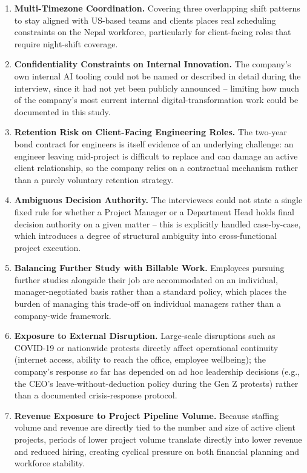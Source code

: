 \documentclass[12pt,a4paper]{report}
\begin{document}
\begin{enumerate}[leftmargin=1.5cm]
  \item \textbf{Multi-Timezone Coordination.} Covering three overlapping shift patterns to stay aligned with US-based teams and clients places real scheduling constraints on the Nepal workforce, particularly for client-facing roles that require night-shift coverage.
  \item \textbf{Confidentiality Constraints on Internal Innovation.} The company's own internal AI tooling could not be named or described in detail during the interview, since it had not yet been publicly announced -- limiting how much of the company's most current internal digital-transformation work could be documented in this study.
  \item \textbf{Retention Risk on Client-Facing Engineering Roles.} The two-year bond contract for engineers is itself evidence of an underlying challenge: an engineer leaving mid-project is difficult to replace and can damage an active client relationship, so the company relies on a contractual mechanism rather than a purely voluntary retention strategy.
  \item \textbf{Ambiguous Decision Authority.} The interviewees could not state a single fixed rule for whether a Project Manager or a Department Head holds final decision authority on a given matter -- this is explicitly handled case-by-case, which introduces a degree of structural ambiguity into cross-functional project execution.
  \item \textbf{Balancing Further Study with Billable Work.} Employees pursuing further studies alongside their job are accommodated on an individual, manager-negotiated basis rather than a standard policy, which places the burden of managing this trade-off on individual managers rather than a company-wide framework.
  \item \textbf{Exposure to External Disruption.} Large-scale disruptions such as COVID-19 or nationwide protests directly affect operational continuity (internet access, ability to reach the office, employee wellbeing); the company's response so far has depended on ad hoc leadership decisions (e.g., the CEO's leave-without-deduction policy during the Gen Z protests) rather than a documented crisis-response protocol.
  \item \textbf{Revenue Exposure to Project Pipeline Volume.} Because staffing volume and revenue are directly tied to the number and size of active client projects, periods of lower project volume translate directly into lower revenue and reduced hiring, creating cyclical pressure on both financial planning and workforce stability.
\end{enumerate}
\end{document}
